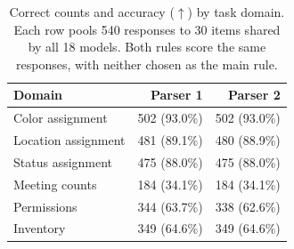 \begin{table}[!b]
\centering
\small
\setlength{\tabcolsep}{4pt}
\begin{tabular}{@{}lrr@{}}
\toprule
Domain & Parser 1 & Parser 2 \\
\midrule
Color assignment & 502 (93.0\%) & 502 (93.0\%) \\
Location assignment & 481 (89.1\%) & 480 (88.9\%) \\
Status assignment & 475 (88.0\%) & 475 (88.0\%) \\
\midrule Meeting counts & 184 (34.1\%) & 184 (34.1\%) \\
Permissions & 344 (63.7\%) & 338 (62.6\%) \\
Inventory & 349 (64.6\%) & 349 (64.6\%) \\
\bottomrule
\end{tabular}
\caption{Correct counts and accuracy ($\uparrow$) by task domain. Each row pools 540 responses to 30 items shared by all 18 models. Both rules score the same responses, with neither chosen as the main rule.}
\label{tab:ef-domain-summary}
\end{table}
